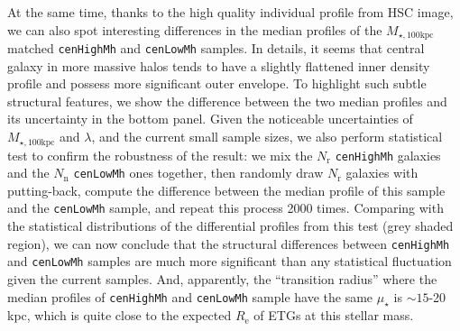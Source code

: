 \documentclass{emulateapj}
\def\rbcg{\texttt{cenHighMh}}
\def\nbcg{\texttt{cenLowMh}}
\def\mtot{{$M_{\star,100\mathrm{kpc}}$}}
\def\mden{{$\mu_{\star}$}}
\begin{document}
\begin{CJK*}{UTF8}{gbsn}
    
    At the same time, thanks to the high quality individual profile from HSC image, 
    we can also spot interesting differences in the median profiles of the \mtot{} 
    matched \rbcg{} and \nbcg{} samples.  
    In details, it seems that central galaxy in more massive halos tends to have 
    a slightly flattened inner density profile and possess more significant outer 
    envelope.   
    To highlight such subtle structural features, we show the difference between 
    the two median profiles and its uncertainty in the bottom panel. 
    Given the noticeable uncertainties of \mtot{} and $\lambda$, and the current small 
    sample sizes, we also perform statistical test to confirm the robustness of the
    result: we mix the $N_{\mathrm{r}}$ \rbcg{} galaxies and the $N_{\mathrm{n}}$ \nbcg{}
    ones together, then randomly draw $N_{\mathrm{r}}$ galaxies with putting-back, 
    compute the difference between the median profile of this sample and the \nbcg{} 
    sample, and repeat this process 2000 times.  
    Comparing with the statistical distributions of the differential profiles from 
    this test (grey shaded region), we can now conclude that the structural 
    differences between \rbcg{} and \nbcg{} samples are much more significant than 
    any statistical fluctuation given the current samples.  
    And, apparently, the ``transition radius'' where the median profiles of \rbcg{} 
    and \nbcg{} sample have the same \mden{} is $\sim 15$-20 kpc, which is quite 
    close to the expected $R_{\mathrm{e}}$ of ETGs at this stellar mass. 
       

\end{CJK*}
\end{document}
